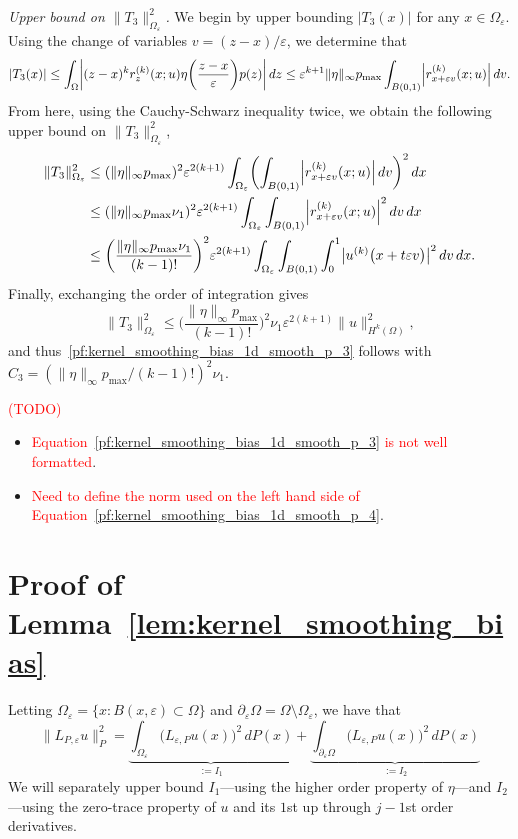 \documentclass{article}
\newcommand{\1}{\mathbf{1}}
\theoremstyle{definition}
\theoremstyle{remark}
\begin{document}
\textit{Upper bound on $\|T_3\|_{\Omega_{\varepsilon}}^2$.}
We begin by upper bounding $|T_3(x)|$ for any $x \in \Omega_{\varepsilon}$. Using the change of variables $v = (z - x)/\varepsilon$, we determine that
\begin{equation*}
|T_3(x)| \leq \int_{\Omega} \biggl| (z - x)^{k} r_z^{(k)}(x;u) \eta\biggl(\frac{z - x}{\varepsilon}\biggr)  p(z) \biggr|\,dz  \leq \varepsilon^{k + 1} \|\eta\|_{\infty} p_{\max} \int_{B(0,1)} \Bigl|r_{x + \varepsilon v}^{(k)}(x;u)\Bigr| \,dv.
\end{equation*}
From here, using the Cauchy-Schwarz inequality twice, we obtain the following upper bound on $\|T_3\|_{\Omega_{\varepsilon}}^2$,
\begin{align*}
\|T_3\|_{\Omega_{\varepsilon}}^2 & \leq (\|\eta\|_{\infty} p_{\max})^2 \varepsilon^{2(k + 1)} \int_{\Omega_{\varepsilon}}\biggl(\int_{B(0,1)} \Bigl|r_{x + \varepsilon v}^{(k)}(x;u)\Bigr| \,dv\biggr)^2 \,dx \\
& \leq (\|\eta\|_{\infty} p_{\max} \nu_1)^2 \varepsilon^{2(k + 1)} \int_{\Omega_{\varepsilon}} \int_{B(0,1)}\Bigl|r_{x + \varepsilon v}^{(k)}(x;u)\Bigr|^2 \,dv \,dx \\
& \leq \biggl(\frac{\|\eta\|_{\infty} p_{\max} \nu_1}{(k - 1)!}\biggr)^2 \varepsilon^{2(k + 1)} \int_{\Omega_{\varepsilon}} \int_{B(0,1)} \int_{0}^{1} \bigl|u^{(k)}\bigl(x + t\varepsilon v\bigr)\bigr|^2 \,dv \,dx.
\end{align*}
Finally, exchanging the order of integration gives
\begin{equation*}
\|T_3\|_{\Omega_{\varepsilon}}^2 \leq \biggl(\frac{\|\eta\|_{\infty} p_{\max}}{(k - 1)!}\biggr)^2 \nu_1 \varepsilon^{2(k + 1)} \|u\|_{H^k(\Omega)}^2,
\end{equation*}
and thus~\eqref{pf:kernel_smoothing_bias_1d_smooth_p_3} follows with $C_3 = (\|\eta\|_{\infty} p_{\max}/(k - 1)!)^2 \nu_1$. 

\textcolor{red}{(TODO)}
\begin{itemize}
	\item \textcolor{red}{Equation~\eqref{pf:kernel_smoothing_bias_1d_smooth_p_3} is not well formatted}.
	\item \textcolor{red}{Need to define the norm used on the left hand side of  Equation~\eqref{pf:kernel_smoothing_bias_1d_smooth_p_4}}.
\end{itemize}

\section{Proof of Lemma~\ref{lem:kernel_smoothing_bias}}
Letting $\Omega_{\varepsilon} = \{x: B(x,\varepsilon) \subset \Omega\}$ and $\partial_{\varepsilon}\Omega = \Omega \setminus \Omega_{\varepsilon}$, we have that 
\begin{equation*}
\|L_{P,\varepsilon}u\|_P^2 = \underbrace{\int_{\Omega_{\varepsilon}} \bigl(L_{\varepsilon,P}u(x)\bigr)^2 \,dP(x)}_{:=I_1} + \underbrace{\int_{\partial_{\varepsilon}\Omega} \bigl(L_{\varepsilon,P}u(x)\bigr)^2 \,dP(x)}_{:=I_2}
\end{equation*}
We will separately upper bound $I_1$---using the higher order property of $\eta$---and $I_2$---using the zero-trace property of $u$ and its $1$st up through $j - 1$st order derivatives.
\end{document}
